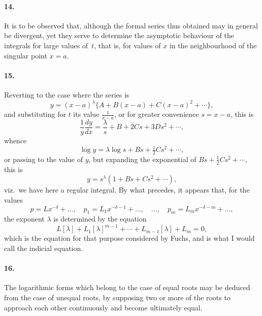 \documentclass[11pt,a4paper]{article}
\theoremstyle{definition}
\begin{document}
\paragraph{14.} It is to be observed that, although the formal series thus obtained may in general be divergent, yet they serve to determine the asymptotic behaviour of the integrals for large values of~$t$, that is, for values of $x$ in the neighbourhood of the singular point $x = a$.

\paragraph{15.} Reverting to the case where the series is
\[
y = (x - a)^{\lambda}\{A + B(x - a) + C(x - a)^{2} + \cdots\},
\]
and substituting for $t$ its value $\frac{1}{x-a}$, or for greater convenience $s = x - a$, this is
\[
\frac{1}{y}\frac{dy}{dx} = \frac{\lambda}{s} + B + 2Cs + 3Ds^{2} + \cdots,
\]
whence
\[
\log y = \lambda\log s + Bs + \tfrac{1}{2}Cs^{2} + \cdots,
\]
or passing to the value of $y$, but expanding the exponential of $Bs + \tfrac{1}{2}Cs^{2} + \cdots$, this is
\[
y = s^{\lambda}(1 + Bs + Cs^{2} + \cdots),
\]
viz.\ we have here a regular integral. By what precedes, it appears that, for the values
\[
p = Lx^{-\delta} + \ldots, \quad p_{1} = L_{1}x^{-\delta-1} + \ldots, \quad \ldots, \quad p_{m} = L_{m}x^{-\delta-m} + \ldots,
\]
the exponent $\lambda$ is determined by the equation
\[
L[\lambda] + L_{1}[\lambda]^{m-1} + \cdots + L_{m-1}[\lambda] + L_{m} = 0,
\]
which is the equation for that purpose considered by Fuchs, and is what I would call the indicial equation.

\paragraph{16.} The logarithmic forms which belong to the case of equal roots may be deduced from the case of unequal roots, by supposing two or more of the roots to approach each other continuously and become ultimately equal.
\end{document}
